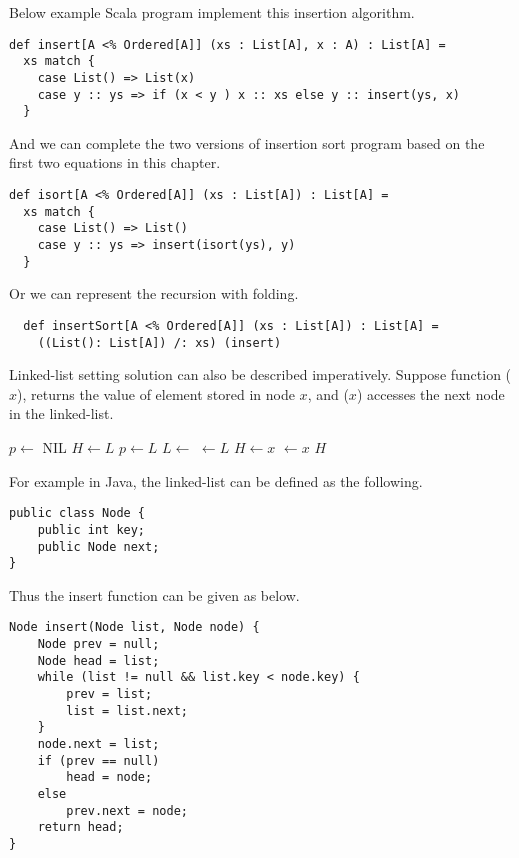 \documentclass{article}
\begin{document}
Below example Scala program implement this insertion algorithm.

\lstset{language=Scala}
\begin{lstlisting}
def insert[A <% Ordered[A]] (xs : List[A], x : A) : List[A] =
  xs match {
    case List() => List(x)
    case y :: ys => if (x < y ) x :: xs else y :: insert(ys, x)
  }
\end{lstlisting}

And we can complete the two versions of insertion sort program based on
the first two equations in this chapter.

\begin{lstlisting}
def isort[A <% Ordered[A]] (xs : List[A]) : List[A] =
  xs match {
    case List() => List()
    case y :: ys => insert(isort(ys), y)
  }
\end{lstlisting}

Or we can represent the recursion with folding.

\begin{lstlisting}
  def insertSort[A <% Ordered[A]] (xs : List[A]) : List[A] =
    ((List(): List[A]) /: xs) (insert)
\end{lstlisting}

Linked-list setting solution can also be described imperatively. Suppose
function ($x$), returns the value of element stored in node
$x$, and ($x$) accesses the next node in the linked-list.

\begin{algorithmic}
  \State $p \gets$ NIL
  \State $H \gets L$
    \State $p \gets L$
    \State $L \gets $ 
  \EndWhile
  \State {} $\gets L$
    \State $H \gets x$
  \Else
    \State {} $\gets x$
  \EndIf
  \State \Return $H$
\EndFunction
\end{algorithmic}

For example in Java, the linked-list can be defined as the following.

\lstset{language=Java}
\begin{lstlisting}
public class Node {
    public int key;
    public Node next;
}
\end{lstlisting}

Thus the insert function can be given as below.

\begin{lstlisting}
Node insert(Node list, Node node) {
    Node prev = null;
    Node head = list;
    while (list != null && list.key < node.key) {
        prev = list;
        list = list.next;
    }
    node.next = list;
    if (prev == null)
        head = node;
    else
        prev.next = node;
    return head;
}
\end{lstlisting}
\end{document}
